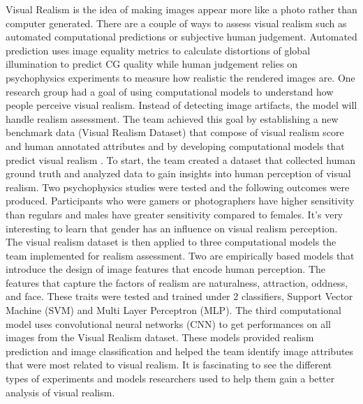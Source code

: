 \documentclass{article}
\begin{document}
Visual Realism is the idea of making images appear more like a photo rather than computer generated. There are a couple of ways to assess visual realism such as automated computational predictions or subjective human judgement. Automated prediction uses image equality metrics to calculate distortions of global illumination to predict CG quality while human judgement relies on psychophysics experiments to measure how realistic the rendered images are. One research group had a goal of using computational models to understand how people perceive visual realism. Instead of detecting image artifacts, the model will handle realism assessment. The team achieved this goal by establishing a new benchmark data (Visual Realism Dataset) that compose of visual realism score and human annotated attributes and by developing computational models that predict visual realism \cite{8022957}. To start, the team created a dataset that collected human ground truth and analyzed data to gain insights into human perception of visual realism. Two psychophysics studies were tested and the following outcomes were produced. Participants who were gamers or photographers have higher sensitivity than regulars and males have greater sensitivity compared to females. It’s very interesting to learn that gender has an influence on visual realism perception. The visual realism dataset is then applied to three computational models the team implemented for realism assessment. Two are empirically based models that introduce the design of image features that encode human perception. The features that capture the factors of realism are naturalness, attraction, oddness, and face. These traits were tested and trained under 2 classifiers, Support Vector Machine (SVM) and Multi Layer Perceptron (MLP). The third computational model uses convolutional neural networks (CNN) to get performances on all images from the Visual Realism dataset. These models provided realism prediction and image classification and helped the team identify image attributes that were most related to visual realism. It is fascinating to see the different types of experiments and models researchers used to help them gain a better analysis of visual realism. 
\end{document}
